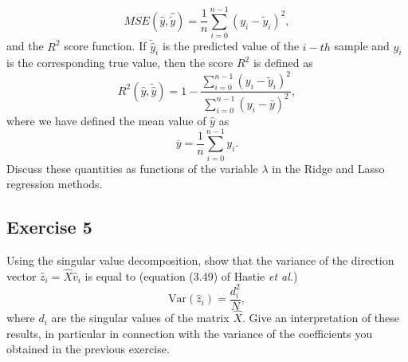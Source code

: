 \documentclass[%
oneside,                 %
final,                   %
10pt]{article}
\begin{document}
\noindent
\[ MSE(\hat{y},\hat{\tilde{y}}) = \frac{1}{n}
\sum_{i=0}^{n-1}(y_i-\tilde{y}_i)^2, 
\] 
and the $R^2$ score function.
If $\tilde{\hat{y}}_i$ is the predicted value of the $i-th$ sample and $y_i$ is the corresponding true value, then the score $R^2$ is defined as
\[
R^2(\hat{y}, \tilde{\hat{y}}) = 1 - \frac{\sum_{i=0}^{n - 1} (y_i - \tilde{y}_i)^2}{\sum_{i=0}^{n - 1} (y_i - \bar{y})^2},
\]
where we have defined the mean value  of $\hat{y}$ as
\[
\bar{y} =  \frac{1}{n} \sum_{i=0}^{n - 1} y_i.
\]
Discuss these quantities as functions of the variable $\lambda$ in the Ridge and Lasso regression methods. 

\subsection{Exercise 5}

Using the singular value decomposition, show that the variance of the direction vector 
$\hat{z}_i=\hat{X}\hat{v}_i$   is equal to (equation (3.49) of Hastie \emph{et al.})
\[
\mathrm{Var}(\hat{z}_i)=\frac{d_i^2}{N},
\]
where $d_i$ are the singular values of the matrix $\hat{X}$. Give an interpretation of these results, in particular in connection with the variance of the coefficients you obtained in the previous exercise. 


\end{document}
